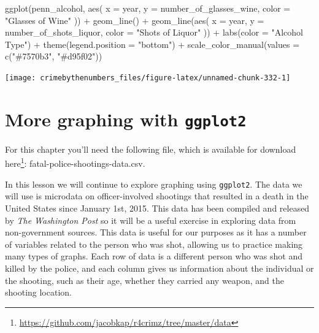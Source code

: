 \documentclass[
  a4paper,
]{krantz}
\makeatletter
\newenvironment{Shaded}{\begin{snugshade}}{\end{snugshade}}
\newcommand{\AttributeTok}[1]{\textcolor[rgb]{0.77,0.63,0.00}{#1}}
\newcommand{\FunctionTok}[1]{\textcolor[rgb]{0.00,0.00,0.00}{#1}}
\newcommand{\NormalTok}[1]{#1}
\newcommand{\SpecialCharTok}[1]{\textcolor[rgb]{0.00,0.00,0.00}{#1}}
\newcommand{\StringTok}[1]{\textcolor[rgb]{0.31,0.60,0.02}{#1}}
\renewcommand{\href}[2]{#2\footnote{\url{#1}}}
\newenvironment{kframe}{%
\medskip{}
\setlength{\fboxsep}{.8em}
 \def\at@end@of@kframe{}%
 \ifinner\ifhmode%
  \def\at@end@of@kframe{\end{minipage}}%
  \begin{minipage}{\columnwidth}%
 \fi\fi%
 \def\FrameCommand##1{\hskip\@totalleftmargin \hskip-\fboxsep
 \colorbox{shadecolor}{##1}\hskip-\fboxsep
     \hskip-\linewidth \hskip-\@totalleftmargin \hskip\columnwidth}%
 \MakeFramed {\advance\hsize-\width
   \@totalleftmargin\z@ \linewidth\hsize
   \@setminipage}}%
 {\par\unskip\endMakeFramed%
 \at@end@of@kframe}
\renewenvironment{Shaded}{\begin{kframe}}{\end{kframe}}
\makeatother
\begin{document}
\begin{Shaded}
\begin{Highlighting}[]
\FunctionTok{ggplot}\NormalTok{(penn\_alcohol, }\FunctionTok{aes}\NormalTok{(}
  \AttributeTok{x =}\NormalTok{ year,}
  \AttributeTok{y =}\NormalTok{ number\_of\_glasses\_wine,}
  \AttributeTok{color =} \StringTok{"Glasses of Wine"}
\NormalTok{)) }\SpecialCharTok{+}
  \FunctionTok{geom\_line}\NormalTok{() }\SpecialCharTok{+}
  \FunctionTok{geom\_line}\NormalTok{(}\FunctionTok{aes}\NormalTok{(}
    \AttributeTok{x =}\NormalTok{ year,}
    \AttributeTok{y =}\NormalTok{ number\_of\_shots\_liquor,}
    \AttributeTok{color =} \StringTok{"Shots of Liquor"}
\NormalTok{  )) }\SpecialCharTok{+}
  \FunctionTok{labs}\NormalTok{(}\AttributeTok{color =} \StringTok{"Alcohol Type"}\NormalTok{) }\SpecialCharTok{+}
  \FunctionTok{theme}\NormalTok{(}\AttributeTok{legend.position =} \StringTok{"bottom"}\NormalTok{) }\SpecialCharTok{+}
  \FunctionTok{scale\_color\_manual}\NormalTok{(}\AttributeTok{values =} \FunctionTok{c}\NormalTok{(}\StringTok{"\#7570b3"}\NormalTok{, }\StringTok{"\#d95f02"}\NormalTok{))}
\end{Highlighting}
\end{Shaded}

\begin{center}\texttt{[image: crimebythenumbers\_files/figure-latex/unnamed-chunk-332-1]} \end{center}

\hypertarget{ois-graphs}{%
\chapter{\texorpdfstring{More graphing with
\texttt{ggplot2}}{More graphing with ggplot2}}\label{ois-graphs}}

For this chapter you'll need the following file, which is
available for download
\href{https://github.com/jacobkap/r4crimz/tree/master/data}{here}:
fatal-police-shootings-data.csv.

In this lesson we will continue to explore graphing using
\texttt{ggplot2}. The data we will use is microdata on
officer-involved shootings that resulted in a death in the
United States since January 1st, 2015. This data has been
compiled and released by \emph{The Washington Post} so it
will be a useful exercise in exploring data from
non-government sources. This data is useful for our purposes
as it has a number of variables related to the person who
was shot, allowing us to practice making many types of
graphs. Each row of data is a different person who was shot
and killed by the police, and each column gives us
information about the individual or the shooting, such as
their age, whether they carried any weapon, and the shooting
location.
\end{document}

